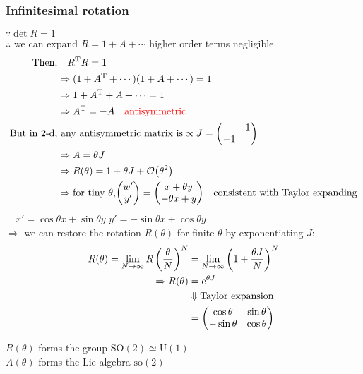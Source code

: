 \documentclass[11pt,fleqn]{book} %
\begin{document}
\subsubsection{Infinitesimal rotation}
  \(\because \det R = 1\) \\
  \(\therefore\) we can expand \(R = 1 + A + \cdots\) \quad higher order terms negligible
\begin{align*}
  \text{Then,}       &\quad R^{\mathrm{T}} R = 1                                                  \\
                     &\Rightarrow (1+ A^{\mathrm{T}} + \cdots) (1 + A + \cdots) = 1               \\
                     &\Rightarrow 1+A^{\mathrm{T}} + A + \cdots = 1                               \\
                     &\Rightarrow A^{\mathrm{T}} = -A \quad \text{\textcolor{red}{antisymmetric}} \\
  \text{But in 2-d,} &\ \text{any antisymmetric matrix is} \propto J = \mqty(\admat{1,-1})        \\
                     &\Rightarrow A = \theta J                                                    \\
                     &\Rightarrow R(\theta) = 1 + \theta J + \order{\theta^2}                     \\
                     &\Rightarrow \text{for tiny \(\theta\),} \mqty(w' \\ y') = \mqty(x + \theta y \\ -\theta x + y) \quad \text{consistent with Taylor expanding}
\end{align*}
\(\quad x' = \cos \theta x + \sin \theta y\) \quad \( y' = -\sin \theta x + \cos \theta
y\)\\
\(\Rightarrow\) we can restore the rotation \(R(\theta)\) for finite \(\theta\)
by exponentiating \(J\):
\begin{align*}
  R(\theta) = \lim_{N \to \infty} R\left( \frac{\theta}{N} \right)^N &= \lim_{N \to \infty} \left( 1 + \frac{\theta J}{N} \right)^N\\
            \Rightarrow R(\theta)                                    &= \mathrm{e}^{\theta J} \\
                                                                     &\Downarrow \text{Taylor expansion} \\
                                                                     &= \mqty(\cos \theta & \sin \theta \\ -\sin \theta & \cos \theta)
\end{align*}
\begin{remark}
  \(R(\theta)\) forms the group \(\mathrm{SO}(2) \simeq \mathrm{U}(1)\) \\
  \(A(\theta)\) forms the Lie algebra \(\mathrm{so}(2)\)
\end{remark}
\end{document}
